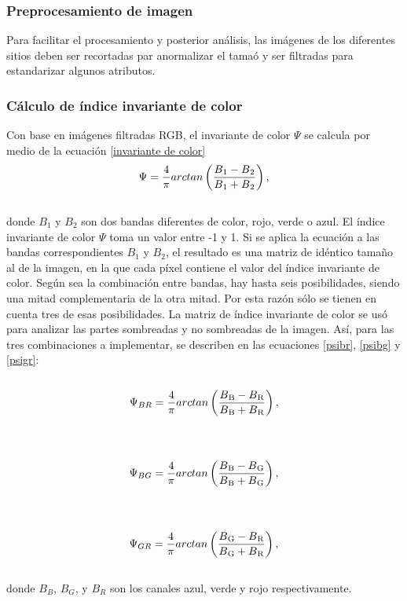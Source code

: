 \subsubsection{Preprocesamiento de imagen} 
Para facilitar el procesamiento y posterior análisis, las imágenes de los diferentes sitios deben ser recortadas par anormalizar el tamaó y ser filtradas para estandarizar algunos atributos.
\subsubsection{Cálculo de índice invariante de color}
Con base en imágenes filtradas RGB, el invariante de color $\Psi$ se calcula por medio de la ecuación \ref{invariante de color}
\\
\begin{equation}
	\Psi=\frac{4}{\pi} arctan\left(\frac{B\textsubscript{1}-B\textsubscript{2}}{B\textsubscript{1}+B\textsubscript{2}}\right),\label{invariante de color}
\end{equation}
\\
 donde $B_1$ y $B_2$ son dos bandas diferentes de color, rojo, verde o azul. El índice invariante de color $\Psi$ toma un valor entre -1 y 1. Si se aplica la ecuación a las bandas correspondientes $B_1$ y $B_2$, el resultado es una matriz de idéntico tamaño al de la imagen, en la que cada píxel contiene el valor del índice invariante de color. Según sea la combinación entre bandas, hay hasta seis posibilidades, siendo una mitad complementaria de la otra mitad. Por esta razón sólo se tienen en cuenta tres de esas posibilidades. La matriz de índice invariante de color se usó para analizar las partes sombreadas y no sombreadas de la imagen. Así, para las tres combinaciones a implementar, se describen en las ecuaciones \ref{psibr}, \ref{psibg} y \ref{psigr}:
 \\
 \\
\begin{equation}
	\Psi_{BR}=\frac{4}{\pi} arctan\left(\frac{B\textsubscript{B}-B\textsubscript{R}}{B\textsubscript{B}+B\textsubscript{R}}\right),\label{psibr}
\end{equation}
\\
\\
\begin{equation}
	\Psi_{BG}=\frac{4}{\pi} arctan\left(\frac{B\textsubscript{B}-B\textsubscript{G}}{B\textsubscript{B}+B\textsubscript{G}}\right),\label{psibg}
\end{equation}
\\
\\
\begin{equation}
	\Psi_{GR}=\frac{4}{\pi} arctan\left(\frac{B\textsubscript{G}-B\textsubscript{R}}{B\textsubscript{G}+B\textsubscript{R}}\right),\label{psigr}
\end{equation}
\\
donde $B_{B}$, $B_{G}$, y $B_{R}$ son los canales azul, verde y rojo respectivamente.
